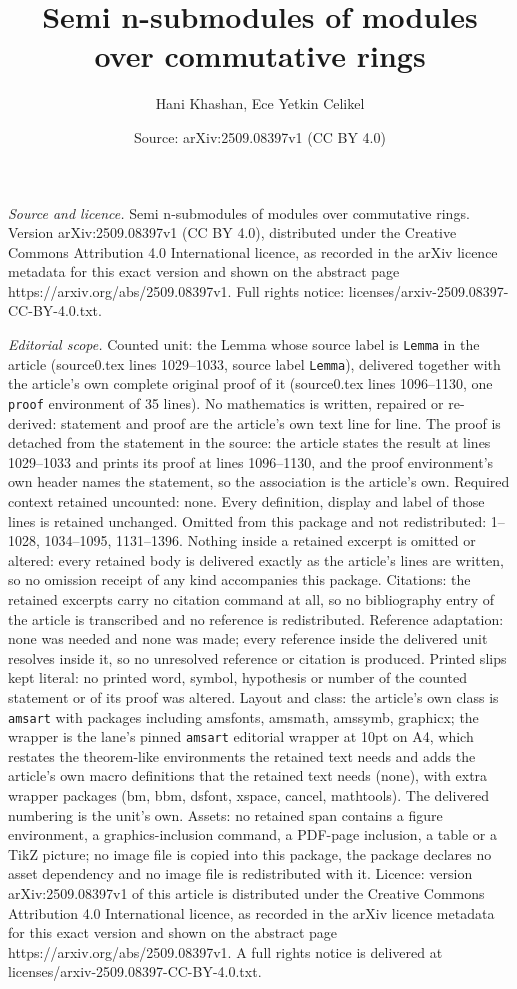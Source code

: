 \documentclass[10pt,a4paper]{amsart}
\title[Semi n-submodules of modules over commutative rings]{Semi n-submodules of modules over commutative rings}
\author{Hani Khashan, Ece Yetkin Celikel}
\date{Source: arXiv:2509.08397v1 (CC BY 4.0)}
\begin{document}
\maketitle

\noindent\emph{Source and licence.} Semi n-submodules of modules over commutative rings. Version arXiv:2509.08397v1 (CC BY 4.0), distributed under the Creative Commons Attribution 4.0 International licence, as recorded in the arXiv licence metadata for this exact version and shown on the abstract page https://arxiv.org/abs/2509.08397v1. Full rights notice: licenses/arxiv-2509.08397-CC-BY-4.0.txt.\par\smallskip

\noindent\textit{Editorial scope.} Counted unit: the Lemma whose source label is \texttt{Lemma} in the article (source0.tex lines 1029--1033, source label \texttt{Lemma}), delivered together with the article's own complete original proof of it (source0.tex lines 1096--1130, one \texttt{proof} environment of 35 lines). No mathematics is written, repaired or re-derived: statement and proof are the article's own text line for line. The proof is detached from the statement in the source: the article states the result at lines 1029--1033 and prints its proof at lines 1096--1130, and the proof environment's own header names the statement, so the association is the article's own. Required context retained uncounted: none. Every definition, display and label of those lines is retained unchanged. Omitted from this package and not redistributed: 1--1028, 1034--1095, 1131--1396. Nothing inside a retained excerpt is omitted or altered: every retained body is delivered exactly as the article's lines are written, so no omission receipt of any kind accompanies this package. Citations: the retained excerpts carry no citation command at all, so no bibliography entry of the article is transcribed and no reference is redistributed. Reference adaptation: none was needed and none was made; every reference inside the delivered unit resolves inside it, so no unresolved reference or citation is produced. Printed slips kept literal: no printed word, symbol, hypothesis or number of the counted statement or of its proof was altered. Layout and class: the article's own class is \texttt{amsart} with packages including amsfonts, amsmath, amssymb, graphicx; the wrapper is the lane's pinned \texttt{amsart} editorial wrapper at 10pt on A4, which restates the theorem-like environments the retained text needs and adds the article's own macro definitions that the retained text needs (none), with extra wrapper packages (bm, bbm, dsfont, xspace, cancel, mathtools). The delivered numbering is the unit's own. Assets: no retained span contains a figure environment, a graphics-inclusion command, a PDF-page inclusion, a table or a TikZ picture; no image file is copied into this package, the package declares no asset dependency and no image file is redistributed with it. Licence: version arXiv:2509.08397v1 of this article is distributed under the Creative Commons Attribution 4.0 International licence, as recorded in the arXiv licence metadata for this exact version and shown on the abstract page https://arxiv.org/abs/2509.08397v1. A full rights notice is delivered at licenses/arxiv-2509.08397-CC-BY-4.0.txt. 
\end{document}
